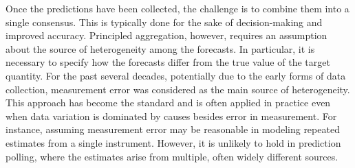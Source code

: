 \documentclass[11pt]{article}
\theoremstyle{definition}
\theoremstyle{definition}
\begin{document}



Once the predictions have been collected, the challenge is to combine them into a single consensus. This is typically done for the sake of decision-making and improved accuracy. Principled aggregation, however, requires an assumption about the source of heterogeneity among the forecasts. In particular, it is necessary to specify how the forecasts differ from the true value of the target quantity. For the past several decades, potentially due to the early forms of data collection, measurement error was considered as the main source of heterogeneity. This approach has become the standard and is often applied in practice even when data variation is dominated  by causes besides error in measurement. For instance, assuming measurement error may be reasonable in modeling repeated estimates from a single instrument. However, it is unlikely to hold in prediction polling, where the estimates arise from multiple, often widely different sources. 

\end{document}
